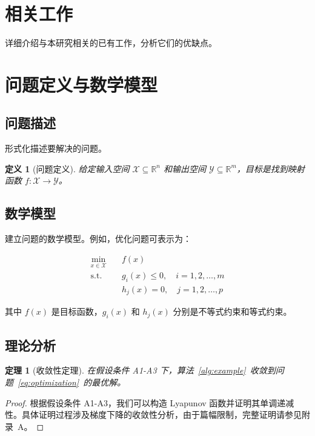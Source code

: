 \documentclass[12pt,a4paper]{article}
\newtheorem{theorem}{定理}[section]
\newtheorem{definition}{定义}[section]
\newcommand{\R}{\mathbb{R}}          %
\begin{document}
\section{相关工作}

详细介绍与本研究相关的已有工作，分析它们的优缺点。

\section{问题定义与数学模型}

\subsection{问题描述}

形式化描述要解决的问题。

\begin{definition}[问题定义]
给定输入空间 $\mathcal{X} \subseteq \R^n$ 和输出空间 $\mathcal{Y} \subseteq \R^m$，目标是找到映射函数 $f: \mathcal{X} \to \mathcal{Y}$。
\end{definition}

\subsection{数学模型}

建立问题的数学模型。例如，优化问题可表示为：

\begin{equation}
\begin{aligned}
    \min_{x \in \mathcal{X}} \quad & f(x) \\
    \text{s.t.} \quad & g_i(x) \leq 0, \quad i = 1, 2, \ldots, m \\
                      & h_j(x) = 0, \quad j = 1, 2, \ldots, p
\end{aligned}
\label{eq:optimization}
\end{equation}

其中 $f(x)$ 是目标函数，$g_i(x)$ 和 $h_j(x)$ 分别是不等式约束和等式约束。

\subsection{理论分析}

\begin{theorem}[收敛性定理]
在假设条件 A1-A3 下，算法~\ref{alg:example}~收敛到问题~\eqref{eq:optimization}~的最优解。
\end{theorem}

\begin{proof}
根据假设条件 A1-A3，我们可以构造 Lyapunov 函数并证明其单调递减性。具体证明过程涉及梯度下降的收敛性分析，由于篇幅限制，完整证明请参见附录~A。
\end{proof}
\end{document}

